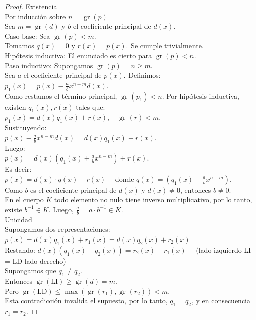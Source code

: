 \begin{proof}
Existencia \\
Por inducción sobre $n = \operatorname{gr}(p)$ \\
Sea $m = \operatorname{gr}(d)$ y $b$ el coeficiente principal de $d(x)$. \\
Caso base: Sea $\operatorname{gr}(p) < m$. \\
Tomamos $q(x) = 0$ y $r(x) = p(x)$. Se cumple trivialmente. \\
Hipótesis inductiva: El enunciado es cierto para $\operatorname{gr}(p) < n$. \\
Paso inductivo: Supongamos $\operatorname{gr}(p) = n \geq m$. \\
Sea $a$ el coeficiente principal de $p(x)$. Definimos: $p_1(x) = p(x) - \frac{a}{b} x^{n-m} d(x)$. \\
Como restamos el término principal, $\operatorname{gr}(p_1) < n$. Por hipótesis inductiva, existen $q_1(x), r(x)$ tales que: $p_1(x) = d(x)q_1(x) + r(x), \quad \operatorname{gr}(r) < m$. \\
Sustituyendo: \\
$p(x) - \frac{a}{b} x^{n-m} d(x) = d(x)q_1(x) + r(x)$. \\
Luego: \\
$p(x) = d(x) \left(q_1(x) + \frac{a}{b} x^{n-m}\right) + r(x)$. \\
Es decir: \\
$p(x) = d(x) \cdot q(x) + r(x) \quad$ donde $q(x) = \left(q_1(x) + \frac{a}{b} x^{n-m}\right)$. \\
Como $b$ es el coeficiente principal de $d(x)$ y $d(x) \neq 0$, entonces $b \neq 0$. \\
En el cuerpo $K$ todo elemento no nulo tiene inverso multiplicativo, por lo tanto, existe $b^{-1} \in K$. Luego, $\frac{a}{b} = a \cdot b^{-1} \in K$. \\
Unicidad \\
Supongamos dos representaciones: \\
$p(x) = d(x)q_1(x) + r_1(x) = d(x)q_2(x) + r_2(x)$ \\
Restando: $d(x)(q_1(x) - q_2(x)) = r_2(x) - r_1(x) \quad$  (lado-izquierdo LI = LD lado-derecho)\\
Supongamos que $q_1 \neq q_2$. \\
Entonces $\operatorname{gr}(\text{LI}) \geq \operatorname{gr}(d) = m$. \\
Pero $\operatorname{gr}(\text{LD}) \leq \max(\operatorname{gr}(r_1), \operatorname{gr}(r_2)) < m$. \\
Esta contradicción invalida el supuesto, por lo tanto, $q_1 = q_2$, y en consecuencia $r_1 = r_2$.
\end{proof}

